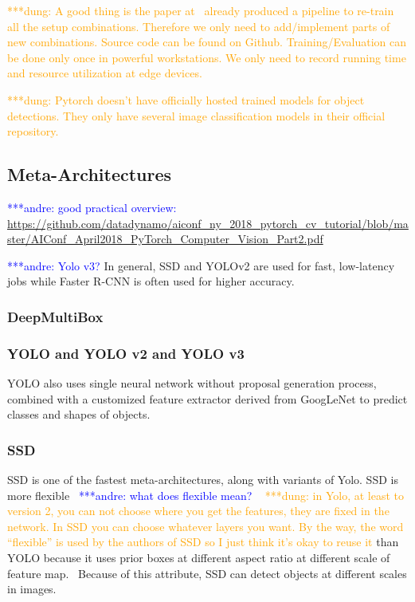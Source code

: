 \documentclass[conference]{IEEEtran}
\newcommand{\alnote}[1]{ {\textcolor{blue} { ***andre: #1 }}}
\newcommand{\dungnote}[1]{ {\textcolor{orange} { ***dung: #1 }}}
\newcommand{\alnote}[1]{}
\newcommand{\dungnote}[1]{}
\begin{document}
\dungnote{A good thing is the paper at~\cite{huang2017speed} already produced a pipeline to re-train all the setup combinations. Therefore we only need to add/implement parts of new combinations. Source code can be found on Github. Training/Evaluation can be done only once in powerful workstations. We only need to record running time and resource utilization at edge devices.}

\dungnote{Pytorch doesn't have officially hosted trained models for object detections. They only have several image classification models in their official repository.}

\subsection{Meta-Architectures}

\alnote{good practical overview: \url{https://github.com/datadynamo/aiconf_ny_2018_pytorch_cv_tutorial/blob/master/AIConf_April2018_PyTorch_Computer_Vision_Part2.pdf}}

\alnote{Yolo v3?}
In general, SSD and YOLOv2 are used for fast, low-latency jobs while Faster R-CNN is often used for higher accuracy.

\subsubsection{DeepMultiBox}


\subsubsection{YOLO and YOLO v2 and YOLO v3}
YOLO also uses single neural network without proposal generation process, combined with a customized feature extractor derived from GoogLeNet to predict classes and shapes of objects.


\subsubsection{SSD}
SSD is one of the fastest meta-architectures, along with variants of Yolo. SSD is more flexible~\alnote{what does flexible mean?} ~\dungnote{in Yolo, at least to version 2, you can not choose where you get the features, they are fixed in the network. In SSD you can choose whatever layers you want. By the way, the word ``flexible'' is used by the authors of SSD so I just think it's okay to reuse it}than YOLO because it uses prior boxes at different aspect ratio at different scale of feature map.~\cite{liu2016ssd} Because of this attribute, SSD can detect objects at different scales in images.
\end{document}
